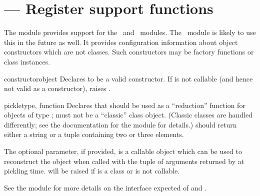 \section{ ---
         Register  support functions}



The  module provides support for the
\ and
\ modules.  The
\ module is likely to use this in the
future as well.  It provides configuration information about object
constructors which are not classes.  Such constructors may be factory
functions or class instances.


\begin{funcdesc}{constructor}{object}
  Declares  to be a valid constructor.  If  is
  not callable (and hence not valid as a constructor), raises
  .
\end{funcdesc}

\begin{funcdesc}{pickle}{type, function}
  Declares that  should be used as a ``reduction''
  function for objects of type ;  must not be a
  ``classic'' class object.  (Classic classes are handled differently;
  see the documentation for the  module for
  details.)   should return either a string or a tuple
  containing two or three elements.

  The optional  parameter, if provided, is a
  callable object which can be used to reconstruct the object when
  called with the tuple of arguments returned by  at
  pickling time.   will be raised if
   is a class or  is not callable.

  See the  module for more
  details on the interface expected of  and
  .
\end{funcdesc}
